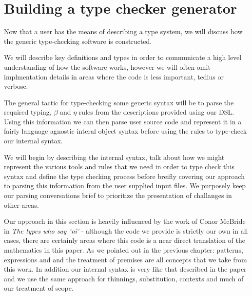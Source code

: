 \chapter{Building a type checker generator}

Now that a user has the means of describing a type system, we will
discuss how the generic type-checking software is constructed.

We will describe key definitions and types in order to communicate a
high level understanding of how the software works,
however we will often omit implmentation details in areas where the
code is less important, tedius or verbose.

The general tactic for type-checking some generic syntax will be to
parse the required typing, $\beta$ and $\eta$ rules from the
descriptions provided using our DSL. Using this information we can
then parse user source code and represent it in a fairly language
agnostic interal object syntax before using the rules to type-check
our internal syntax.

We will begin by describing the internal syntax, talk about how we
might represent the various tools and rules that we need in order to
type check this syntax and define the type checking process before
breifly covering our approach to parsing this information from the
user supplied input files. We purposely keep our parsing conversations
brief to prioritize the presentation of challanges in other areas.

Our approach in this section is heavily influenced by the work of
Conor McBride in \emph{The types who say 'ni'} \cite{TypesWhoSayNi} -
although the code we provide is strictly our own in all cases, there
are certainly areas where this code is a near direct translation of
the mathematics in this paper. As we pointed out in the previous
chapter: patterns, expressions and and the treatment of premises are
all concepts that we take from this work. In addition our internal
syntax is very like that described in the paper and we use the same
approach for thinnings, substitution, contexts and much of our
treatment of scope.

\\\\
















